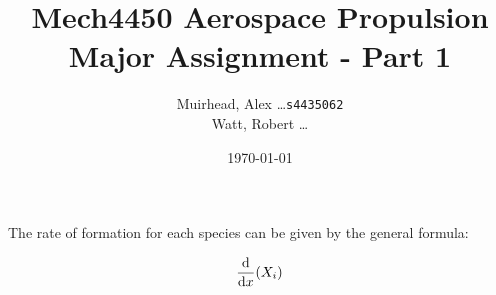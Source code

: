 \documentclass[a4paper]{article}
\title{
	\Large {\sc Mech}4450 Aerospace Propulsion \\
	\Huge Major Assignment - Part 1
}
\author{
	Muirhead, Alex \dots \texttt{s4435062} \\
	Watt, Robert \dots
}
\date{\today}
\begin{document}
\maketitle


\vspace{10em}

\newpage
{}

The rate of formation for each species can be given by the general formula:

\begin{equation}
	\label{eq:General rate}
	\frac{\mathrm{d}}{\mathrm{d}x} (X_i)
\end{equation}
\end{document}

